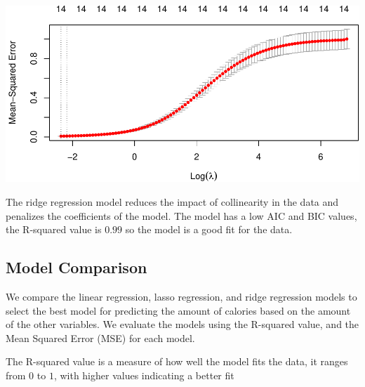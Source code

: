 \documentclass[
]{article}
\newenvironment{Shaded}{\begin{snugshade}}{\end{snugshade}}
\newcommand{\AttributeTok}[1]{\textcolor[rgb]{0.13,0.29,0.53}{#1}}
\newcommand{\ConstantTok}[1]{\textcolor[rgb]{0.56,0.35,0.01}{#1}}
\newcommand{\DecValTok}[1]{\textcolor[rgb]{0.00,0.00,0.81}{#1}}
\newcommand{\FunctionTok}[1]{\textcolor[rgb]{0.13,0.29,0.53}{\textbf{#1}}}
\newcommand{\NormalTok}[1]{#1}
\newcommand{\OtherTok}[1]{\textcolor[rgb]{0.56,0.35,0.01}{#1}}
\newcommand{\SpecialCharTok}[1]{\textcolor[rgb]{0.81,0.36,0.00}{\textbf{#1}}}
\begin{document}
\begin{Shaded}
\end{Shaded}

\begin{center}\includegraphics{Statistical_Learning_Final_Report_files/figure-latex/ridge_regression-1} \end{center}

The ridge regression model reduces the impact of collinearity in the
data and penalizes the coefficients of the model. The model has a low
AIC and BIC values, the R-squared value is \(0.99\) so the model is a
good fit for the data.

\subsection{Model Comparison}\label{model-comparison}

We compare the linear regression, lasso regression, and ridge regression
models to select the best model for predicting the amount of calories
based on the amount of the other variables. We evaluate the models using
the R-squared value, and the Mean Squared Error (MSE) for each model.

The R-squared value is a measure of how well the model fits the data, it
ranges from \(0\) to \(1\), with higher values indicating a better fit
\end{document}
